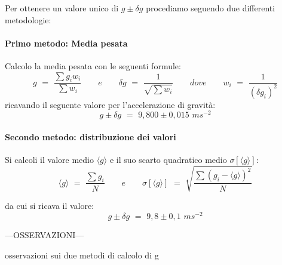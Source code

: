 Per ottenere un valore unico di $g \pm \delta g$ procediamo seguendo due differenti metodologie:

\paragraph{Primo metodo: Media pesata\\}

Calcolo la media pesata con le seguenti formule:
\begin{equation}
	g \,\, = \,\, \frac{\sum g_iw_i}{\sum w_i} \quad\quad e \quad\quad \delta g \,\, = \,\, \frac{1}{\sqrt{\sum w_i}} \quad\quad dove \quad\quad w_i \,\, = \,\, \frac{1}{(\delta g_i)^2}
\end{equation}
%
ricavando il seguente valore per l'accelerazione di gravità:
\begin{equation}
	g \pm \delta g \,\, = \,\, 9,800 \pm 0,015 \,\, ms^{-2}
\end{equation}

\paragraph{Secondo metodo: distribuzione dei valori\\}

Si calcoli il valore medio $\langle g\rangle$ e il suo scarto quadratico medio $\sigma[\langle g \rangle]$:
\begin{equation}
	\langle g \rangle \,\, = \,\, \frac{\sum g_i}{N} \quad\quad 	e	\quad\quad	\sigma[\langle g \rangle] \,\, = \,\, \sqrt{\frac{\sum (g_i - \langle g \rangle)^2}{N}}
\end{equation}

da cui si ricava il valore:
\begin{equation}
	g \pm \delta g \,\, = \,\, 9,8 \pm 0,1 \,\, ms^{-2}
\end{equation}


\begin{center}
	---OSSERVAZIONI---
	
	osservazioni sui due metodi di calcolo di g
\end{center}
